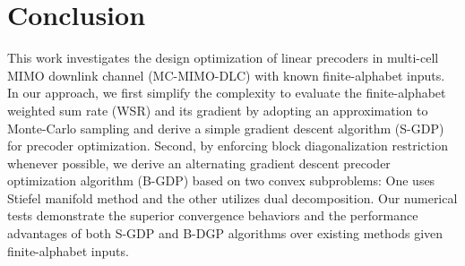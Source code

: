 \documentclass{article}
\begin{document}
\vspace*{-3mm}

\section{Conclusion}
\label{sec:con}
\vspace*{-2mm}

This work investigates the design optimization of linear precoders in multi-cell MIMO downlink channel (MC-MIMO-DLC)
with known finite-alphabet inputs.  In our approach,
we first simplify the complexity to evaluate the finite-alphabet weighted sum rate (WSR) and its gradient by adopting an approximation
to Monte-Carlo sampling and derive a simple gradient descent algorithm (S-GDP) for precoder optimization. Second,
by enforcing block diagonalization restriction whenever possible, we derive an alternating gradient
descent precoder optimization algorithm (B-GDP) based on
two convex subproblems: One uses Stiefel manifold method and the other utilizes dual decomposition.
Our numerical tests demonstrate the superior
convergence behaviors and the performance advantages of
both S-GDP and B-DGP algorithms over existing methods given finite-alphabet inputs.

\vfill\pagebreak



\end{document}
